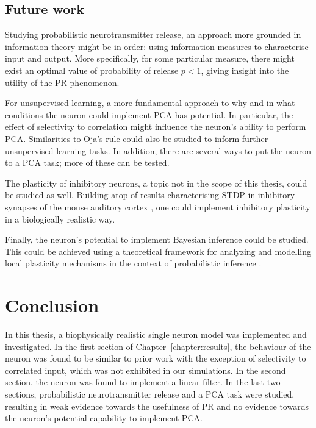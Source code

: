 \documentclass[a4paper,12pt]{report}
\theoremstyle{definition}
\begin{document}
\section{Future work}

Studying probabilistic neurotransmitter release, an approach more grounded in information theory might be in order: using information measures to characterise input and output. More specifically, for some particular measure, there might exist an optimal value of probability of release $p < 1$, giving insight into the utility of the PR phenomenon.

For unsupervised learning, a more fundamental approach to why and in what conditions the neuron could implement PCA has potential. In particular, the effect of selectivity to correlation might influence the neuron's ability to perform PCA. Similarities to Oja's rule could also be studied to inform further unsupervised learning tasks. In addition, there are several ways to put the neuron to a PCA task; more of these can be tested. 

The plasticity of inhibitory neurons, a topic not in the scope of this thesis, could be studied as well. Building atop of results characterising STDP in inhibitory synapses of the mouse auditory cortex \cite{d2015inhibitory}, one could implement inhibitory plasticity in a biologically realistic way.

Finally, the neuron's potential to implement Bayesian inference could be studied. This could be achieved using a theoretical framework for analyzing and modelling local plasticity mechanisms in the context of probabilistic inference \cite{kappel2015network}.




\chapter*{Conclusion}

In this thesis, a biophysically realistic single neuron model was implemented and investigated. In the first section of Chapter~\ref{chapter:results}, the behaviour of the neuron was found to be similar to prior work with the exception of selectivity to correlated input, which was not exhibited in our simulations. In the second section, the neuron was found to implement a linear filter. In the last two sections, probabilistic neurotransmitter release and a PCA task were studied, resulting in weak evidence towards the usefulness of PR and no evidence towards the neuron's potential capability to implement PCA.
\end{document}
